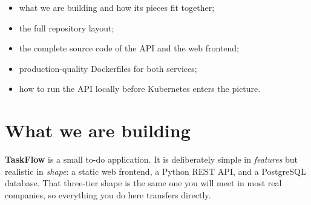 \label{ch:capstone-code}

\begin{objectives}
\begin{itemize}
  \item what we are building and how its pieces fit together;
  \item the full repository layout;
  \item the complete source code of the API and the web frontend;
  \item production-quality Dockerfiles for both services;
  \item how to run the API locally before Kubernetes enters the picture.
\end{itemize}
\end{objectives}

\section{What we are building}

\textbf{TaskFlow} is a small to-do application. It is deliberately simple in
\emph{features} but realistic in \emph{shape}: a static web frontend, a Python
REST API, and a PostgreSQL database. That three-tier shape is the same one you
will meet in most real companies, so everything you do here transfers directly.

